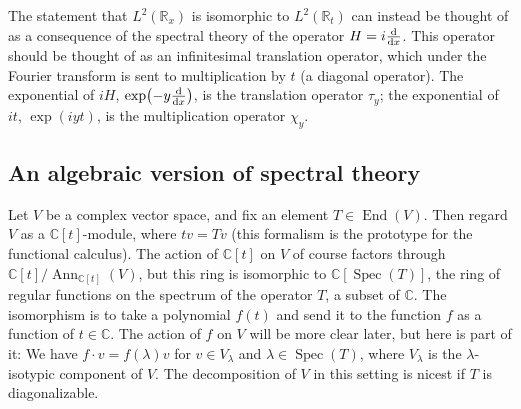 \documentclass[11pt,leqno]{article}
\theoremstyle{plain}
\theoremstyle{definition}
\numberwithin{equation}{section}
\numberwithin{lem}{section}
\DeclareMathOperator{\End}{End}
\DeclareMathOperator{\Spec}{Spec}
\DeclareMathOperator{\Ann}{Ann}
\begin{document}
The statement that $L^2(\mathbb R_x)$ is isomorphic to $L^2(\mathbb R_t)$ can instead be thought of as a consequence of the spectral theory of the operator $H = i\dv{x}$. This operator should be thought of as an infinitesimal translation operator, which under the Fourier transform is sent to multiplication by $t$ (a diagonal operator). The exponential of $iH$, $\exp(-y\dv{x})$, is the translation operator $\tau_y$; the exponential of $it$, $\exp(iyt)$, is the multiplication operator $\chi_y$.

\subsection{An algebraic version of spectral theory}
Let $V$ be a complex vector space, and fix an element $T\in \End(V)$. Then regard $V$ as a $\mathbb C[t]$-module, where $tv = Tv$ (this formalism is the prototype for the functional calculus). The action of $\mathbb C[t]$ on $V$ of course factors through $\mathbb C[t]/\Ann_{\mathbb C[t]}(V)$, but this ring is isomorphic to $\mathbb C[\Spec(T)]$, the ring of regular functions on the spectrum of the operator $T$, a subset of $\mathbb C$. The isomorphism is to take a polynomial $f(t)$ and send it to the function $f$ as a function of $t\in\mathbb C$. The action of $f$ on $V$ will be more clear later, but here is part of it: We have $f\cdot v = f(\lambda)v$ for $v\in V_\lambda$ and $\lambda\in\Spec(T)$, where $V_\lambda$ is the $\lambda$-isotypic component of $V$. The decomposition of $V$ in this setting is nicest if $T$ is diagonalizable.
\end{document}
